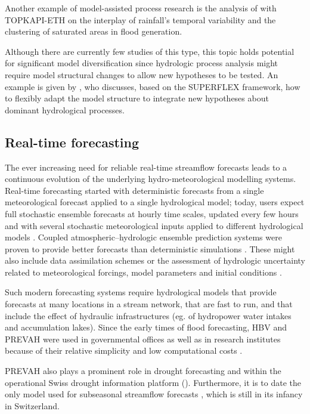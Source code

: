 \documentclass[10pt,a4paper]{article}
\begin{document}
Another example of model-assisted process research is the analysis
of \citet{Paschalis_2014} with TOPKAPI-ETH on the interplay of rainfall's
temporal variability and the clustering of saturated areas in flood
generation.

Although there are currently few studies of this type, this topic holds
potential for significant model diversification since hydrologic process
analysis might require model structural changes to allow new hypotheses
to be tested. An example is given by \citet{DalMolin2020}, who discusses,
based on the SUPERFLEX framework, how to flexibly adapt the model
structure to integrate new hypotheses about dominant hydrological
processes.

\subsection{Real-time forecasting}
\label{sec:application:forecasting}

The ever increasing need for reliable real-time streamflow forecasts
leads to a continuous evolution of the underlying hydro-meteorological
modelling systems. Real-time forecasting started with deterministic
forecasts from a single meteorological forecast applied to a single
hydrological model; today, users expect full stochastic ensemble
forecasts at hourly time scales, updated every few hours and with
several stochastic meteorological inputs applied to different
hydrological models \citep{Karsten2016}. Coupled atmospheric--hydrologic
ensemble prediction systems were proven to provide better forecasts
than deterministic simulations \citep{Verbunt2007,Zappa2008,Jaun2008a,Liechti2013}.
These might also include data assimilation schemes \citep{J_rg_Hess_2015} or the assessment
of hydrologic uncertainty related to meteorological forcings, model
parameters and initial conditions \citep{Zappa2011a,Fundel2011}.

Such modern forecasting systems require hydrological models that provide
forecasts at many locations in a stream network, that are fast to run,
and that include the effect of hydraulic infrastructures (eg. of
hydropower water intakes and accumulation lakes). Since the early times
of flood forecasting, HBV and PREVAH were used in governmental offices
\citep{Karsten2016} as well as in research institutes because of their
relative simplicity and low computational costs \citep{Verbunt2006,Addor_2011,Murphy_2019,Antonetti2019}.

PREVAH also plays a prominent role in drought
forecasting \citep{Fundel2013,J_rg_Hess_2015,Bogner2018b} and within the operational Swiss drought
information platform (\citealp{Stahli2013}). Furthermore, it is to date
the only model used for subseasonal streamflow
forecasts \citep{Monhart_2019,Anghileri2019}, which is still in its infancy in
Switzerland.
\end{document}
